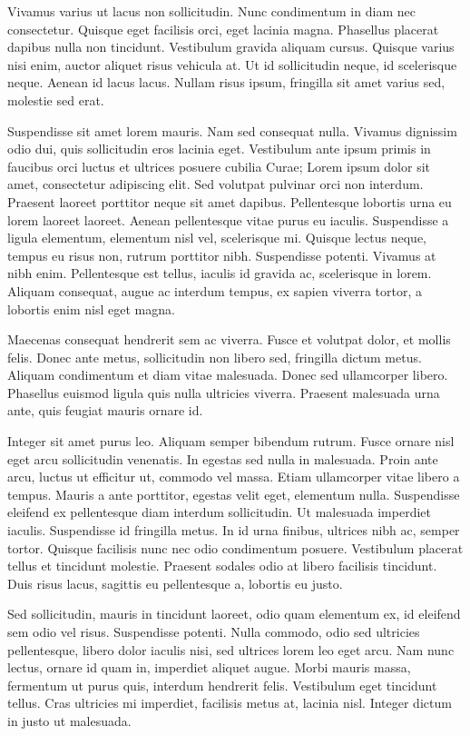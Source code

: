 Vivamus varius ut lacus non sollicitudin. Nunc condimentum in diam nec consectetur. Quisque eget facilisis orci, eget lacinia magna. Phasellus placerat dapibus nulla non tincidunt. Vestibulum gravida aliquam cursus. Quisque varius nisi enim, auctor aliquet risus vehicula at. Ut id sollicitudin neque, id scelerisque neque. Aenean id lacus lacus. Nullam risus ipsum, fringilla sit amet varius sed, molestie sed erat.

Suspendisse sit amet lorem mauris. Nam sed consequat nulla. Vivamus dignissim odio dui, quis sollicitudin eros lacinia eget. Vestibulum ante ipsum primis in faucibus orci luctus et ultrices posuere cubilia Curae; Lorem ipsum dolor sit amet, consectetur adipiscing elit. Sed volutpat pulvinar orci non interdum. Praesent laoreet porttitor neque sit amet dapibus. Pellentesque lobortis urna eu lorem laoreet laoreet. Aenean pellentesque vitae purus eu iaculis. Suspendisse a ligula elementum, elementum nisl vel, scelerisque mi. Quisque lectus neque, tempus eu risus non, rutrum porttitor nibh. Suspendisse potenti. Vivamus at nibh enim. Pellentesque est tellus, iaculis id gravida ac, scelerisque in lorem. Aliquam consequat, augue ac interdum tempus, ex sapien viverra tortor, a lobortis enim nisl eget magna.

Maecenas consequat hendrerit sem ac viverra. Fusce et volutpat dolor, et mollis felis. Donec ante metus, sollicitudin non libero sed, fringilla dictum metus. Aliquam condimentum et diam vitae malesuada. Donec sed ullamcorper libero. Phasellus euismod ligula quis nulla ultricies viverra. Praesent malesuada urna ante, quis feugiat mauris ornare id.

Integer sit amet purus leo. Aliquam semper bibendum rutrum. Fusce ornare nisl eget arcu sollicitudin venenatis. In egestas sed nulla in malesuada. Proin ante arcu, luctus ut efficitur ut, commodo vel massa. Etiam ullamcorper vitae libero a tempus. Mauris a ante porttitor, egestas velit eget, elementum nulla. Suspendisse eleifend ex pellentesque diam interdum sollicitudin. Ut malesuada imperdiet iaculis. Suspendisse id fringilla metus. In id urna finibus, ultrices nibh ac, semper tortor. Quisque facilisis nunc nec odio condimentum posuere. Vestibulum placerat tellus et tincidunt molestie. Praesent sodales odio at libero facilisis tincidunt. Duis risus lacus, sagittis eu pellentesque a, lobortis eu justo.

Sed sollicitudin, mauris in tincidunt laoreet, odio quam elementum ex, id eleifend sem odio vel risus. Suspendisse potenti. Nulla commodo, odio sed ultricies pellentesque, libero dolor iaculis nisi, sed ultrices lorem leo eget arcu. Nam nunc lectus, ornare id quam in, imperdiet aliquet augue. Morbi mauris massa, fermentum ut purus quis, interdum hendrerit felis. Vestibulum eget tincidunt tellus. Cras ultricies mi imperdiet, facilisis metus at, lacinia nisl. Integer dictum in justo ut malesuada.

